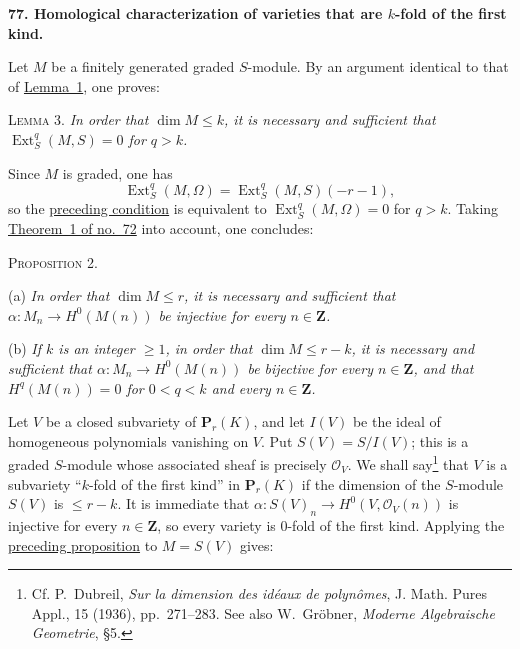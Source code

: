 
\medskip
{}\label{fac:III:5:no:77}
\textbf{77. Homological characterization of varieties that are
$k$-fold of the first kind.}

Let $M$ be a finitely generated graded $S$-module. By an argument
identical to that of \hyperref[fac:III:5:no:74:lemma:1]{Lemma~1}, one
proves:

\label{fac:III:5:no:77:lemma:3}
\textsc{Lemma 3.} \textit{In order that $\dim M\leq k$, it is necessary
and sufficient that $\operatorname{Ext}_S^q(M,S)=0$ for $q>k$.}

Since $M$ is graded, one has
\label{fac:III:5:no:77:formula:Ext-twist}
\[
\operatorname{Ext}_S^q(M,\Omega)
=\operatorname{Ext}_S^q(M,S)(-r-1),
\]
so the \hyperref[fac:III:5:no:77:lemma:3]{preceding condition} is equivalent to
$\operatorname{Ext}_S^q(M,\Omega)=0$ for $q>k$. Taking
\hyperref[fac:III:4:no:72:thm:1]{Theorem~1 of no.~72} into account, one
concludes:

\label{fac:III:5:no:77:prop:2}
\textsc{Proposition 2.}

\label{fac:III:5:no:77:prop:2:a}
(a) \textit{In order that $\dim M\leq r$, it is
necessary and sufficient that
$\alpha:M_n\to H^0(M(n))$ be injective for every $n\in\mathbf Z$.}

\label{fac:III:5:no:77:prop:2:b}
(b) \textit{If $k$ is an integer $\geq1$, in order that
$\dim M\leq r-k$, it is necessary and sufficient that
$\alpha:M_n\to H^0(M(n))$ be bijective for every $n\in\mathbf Z$, and
that $H^q(M(n))=0$ for $0<q<k$ and every $n\in\mathbf Z$.}

Let $V$ be a closed subvariety of $\mathbf P_r(K)$, and let $I(V)$ be
the ideal of homogeneous polynomials vanishing on $V$. Put
$S(V)=S/I(V)$; this is a graded $S$-module whose associated sheaf is
precisely $\mathcal O_V$.
\label{fac:III:5:no:77:def:k-fold-first-kind}
We shall say\footnote{Cf. P.~Dubreil,
\textit{Sur la dimension des id\'eaux de polyn\^omes}, J. Math. Pures
Appl., 15 (1936), pp.~271--283. See also W.~Gr\"obner,
\textit{Moderne Algebraische Geometrie}, \S5.} that $V$ is a
subvariety ``$k$-fold of the first kind'' in $\mathbf P_r(K)$ if the
dimension of the $S$-module $S(V)$ is $\leq r-k$. It is immediate that
$\alpha:S(V)_n\to H^0(V,\mathcal O_V(n))$ is injective for every
$n\in\mathbf Z$, so every variety is $0$-fold of the first kind.
Applying the \hyperref[fac:III:5:no:77:prop:2]{preceding proposition} to $M=S(V)$ gives:

